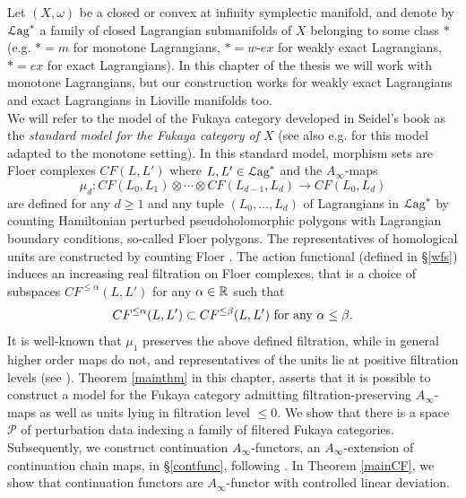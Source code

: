 Let $(X,\omega)$ be a closed or convex at infinity symplectic manifold, and denote by ${\mathcal{L}\text{ag}}^*$ a family of closed Lagrangian submanifolds of $X$ belonging to some class $*$ (e.g. $*=m$ for monotone Lagrangians, $*=w\text{-}ex$ for weakly exact Lagrangians, $*=ex$ for exact Lagrangians). In this chapter of the thesis we will work with monotone Lagrangians, but our construction works for weakly exact Lagrangians and exact Lagrangians in Lioville manifolds too.\\ We will refer to the model of the Fukaya category developed in Seidel's book \cite{Se:book-fukaya-categ} as the \textit{standard model for the Fukaya category of $X$} (see also e.g. \cite{Bi-Co:cob1, Bi-Co:lcob-fuk,Bi-Co-Sh:LagrSh} for this model adapted to the monotone setting). In this standard model, morphism sets are Floer complexes $CF(L,L')$ where $L,L'\in {\mathcal{L}\text{ag}}^*$ and the $A_\infty$-maps $$\mu_d: CF(L_0,L_1)\otimes \cdots \otimes CF(L_{d-1},L_d)\to CF(L_0,L_d)$$ are defined for any $d\geq 1$ and any tuple $(L_0,\ldots, L_d)$ of Lagrangians in ${\mathcal{L}\text{ag}}^*$ by counting Hamiltonian perturbed pseudoholomorphic polygons with Lagrangian boundary conditions, so-called Floer polygons. The representatives of homological units are constructed by counting Floer . The action functional (defined in \S \ref{wfs}) induces an increasing real filtration on Floer complexes, that is a choice of subspaces $CF^{\leq \alpha}(L,L')$ for any $\alpha \in \mathbb{R}$ such that $$CF^{\leq \alpha}(L,L')\subset CF^{\leq \beta}(L,L') \textnormal{   for any }\alpha\leq \beta.$$ It is well-known that $\mu_1$ preserves the above defined filtration, while in general higher order maps do not, and representatives of the units lie at positive filtration levels (see \cite{Bi-Co-Sh:LagrSh}). Theorem \ref{mainthm} in this chapter, asserts that it is possible to construct a model for the Fukaya category admitting filtration-preserving $A_\infty$-maps as well as units lying in filtration level $\leq 0$. We show that there is a space $\mathcal{P}$ of perturbation data indexing a family of filtered Fukaya categories. Subsequently, we construct continuation $A_\infty$-functors, an $A_\infty$-extension of continuation chain maps, in \S \ref{contfunc}, following \cite{Sylvan2019OnCategories}. In Theorem \ref{mainCF}, we show that continuation functors are $A_\infty$-functor with controlled linear deviation.

